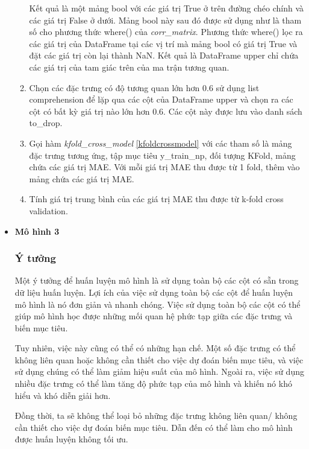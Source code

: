 \documentclass[]{article}
\begin{document}
\begin{itemize}
\begin{enumerate}
    Kết quả là một mảng bool với các giá trị True ở trên đường chéo chính và các giá trị False ở dưới. Mảng bool này sau đó được sử dụng như là tham số cho phương thức where() của \textit{corr\_matrix}. Phương thức where() lọc ra các giá trị của DataFrame tại các vị trí mà mảng bool có giá trị True và đặt các giá trị còn lại thành NaN. Kết quả là DataFrame upper chỉ chứa các giá trị của tam giác trên của ma trận tương quan.
    \item Chọn các đặc trưng có độ tương quan lớn hơn 0.6 sử dụng list comprehension để lặp qua các cột của DataFrame upper và chọn ra các cột có bất kỳ giá trị nào lớn hơn 0.6. Các cột này được lưu vào danh sách to\_drop.
    \item Gọi hàm \textit{kfold\_cross\_model} \ref{kfoldcrossmodel} với các tham số là mảng đặc trưng tương ứng, tập mục tiêu y\_train\_np, đối tượng KFold, mảng chứa các giá trị MAE. Với mỗi giá trị MAE thu được từ 1 fold, thêm vào mảng chứa các giá trị MAE.
    \item Tính giá trị trung bình của các giá trị MAE thu được từ k-fold cross validation.
  \end{enumerate}
  \item \textbf{Mô hình 3}
  \subsubsection{Ý tưởng}
  Một ý tưởng để huấn luyện mô hình là sử dụng toàn bộ các cột có sẵn trong dữ liệu huấn luyện. Lợi ích của việc sử dụng toàn bộ các cột để huấn luyện mô hình là nó đơn giản và nhanh chóng. Việc sử dụng toàn bộ các cột có thể giúp mô hình học được những mối quan hệ phức tạp giữa các đặc trưng và biến mục tiêu.

  Tuy nhiên, việc này cũng có thể có những hạn chế. Một số đặc trưng có thể không liên quan hoặc không cần thiết cho việc dự đoán biến mục tiêu, và việc sử dụng chúng có thể làm giảm hiệu suất của mô hình. Ngoài ra, việc sử dụng nhiều đặc trưng có thể làm tăng độ phức tạp của mô hình và khiến nó khó hiểu và khó diễn giải hơn.

  Đồng thời, ta sẽ không thể loại bỏ những đặc trưng không liên quan/ không cần thiết cho việc dự đoán biến mục tiêu. Dẫn đến có thể làm cho mô hình được huấn luyện không tối ưu.


\end{itemize}
\end{document}
